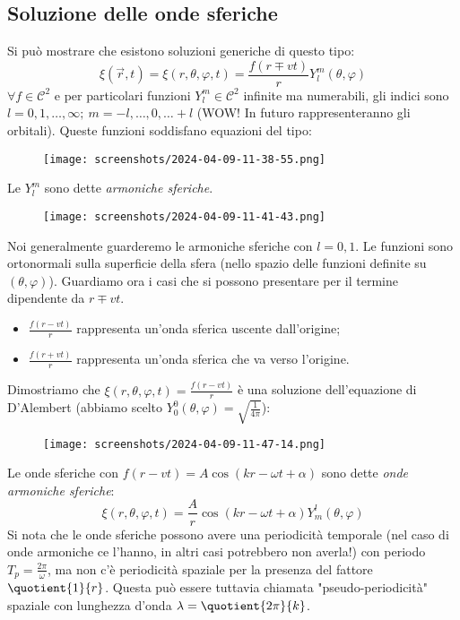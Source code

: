 \subsection{Soluzione delle onde sferiche}
Si può mostrare che esistono soluzioni generiche di questo tipo:
\begin{equation}
	\xi (\vec{r},t)=\xi (r,\theta ,\varphi ,t)=\frac{f(r\mp vt)}{r}Y^m_l(\theta ,\varphi )
\end{equation}
\(\forall f \in \mathcal{C} ^{2}\) e per particolari funzioni \(Y_l^m \in \mathcal{C} ^{2} \) infinite ma numerabili, gli indici sono \(l=0,1,\dots , \infty ;\ m =-l, \dots ,0,\dots +l\) (WOW! In futuro rappresenteranno gli orbitali). Queste funzioni soddisfano equazioni del tipo:
\begin{figure}[H]
	\centering
	\texttt{[image: screenshots/2024-04-09-11-38-55.png]}
\end{figure}
Le \(Y_l^m\) sono dette \emph{armoniche sferiche}.
\begin{figure}[H]
	\centering
	\texttt{[image: screenshots/2024-04-09-11-41-43.png]}
\end{figure}
Noi generalmente guarderemo le armoniche sferiche con \(l=0,1\). Le funzioni sono ortonormali sulla superficie della sfera (nello spazio delle funzioni definite su \((\theta ,\varphi )\)).
Guardiamo ora i casi che si possono presentare per il termine dipendente da \(r\mp vt\).
\begin{itemize}
	\item \(\frac{f(r-vt)}{r}\) rappresenta un'onda sferica uscente dall'origine;
	\item \(\frac{f(r+vt)}{r}\) rappresenta un'onda sferica che va verso l'origine.
\end{itemize}
Dimostriamo che \(\xi (r,\theta ,\varphi ,t) = \frac{f(r-vt)}{r}\) è una soluzione dell'equazione di D'Alembert (abbiamo scelto \(Y_0^0(\theta ,\varphi )=\sqrt{\frac{1}{4\pi }} \)):
\begin{figure}[H]
	\centering
	\texttt{[image: screenshots/2024-04-09-11-47-14.png]}
\end{figure}
Le onde sferiche con \(f(r-vt)=A\cos (kr-\omega t +\alpha )\) sono dette \emph{onde armoniche sferiche}:
\begin{equation}
	\xi (r,\theta ,\varphi ,t)=\frac{A}{r}\cos (kr- \omega t+\alpha )Y_m^l(\theta ,\varphi )
\end{equation}
Si nota che le onde sferiche possono avere una periodicità temporale (nel caso di onde armoniche ce l'hanno, in altri casi potrebbero non averla!) con periodo \(T_p=\frac{2\pi }{\omega }\), ma non c'è periodicità spaziale per la presenza del fattore \(\quotient{1}{r}\). Questa può essere tuttavia chiamata "pseudo-periodicità" spaziale con lunghezza d'onda \(\lambda =\quotient{2\pi }{k} \).


